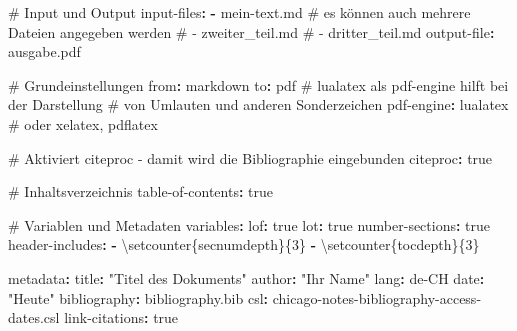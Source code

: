\documentclass[
  nswissgerman,
  a4paper,
  DIV=11,
  numbers=noendperiod,
  ngerman]{scrreprt}
\newenvironment{Shaded}{\begin{snugshade}}{\end{snugshade}}
\newcommand{\AttributeTok}[1]{\textcolor[rgb]{0.40,0.45,0.13}{#1}}
\newcommand{\CharTok}[1]{\textcolor[rgb]{0.13,0.47,0.30}{#1}}
\newcommand{\CommentTok}[1]{\textcolor[rgb]{0.37,0.37,0.37}{#1}}
\newcommand{\FunctionTok}[1]{\textcolor[rgb]{0.28,0.35,0.67}{#1}}
\newcommand{\KeywordTok}[1]{\textcolor[rgb]{0.00,0.23,0.31}{\textbf{#1}}}
\newcommand{\StringTok}[1]{\textcolor[rgb]{0.13,0.47,0.30}{#1}}
\begin{document}
\begin{Shaded}
\begin{Highlighting}[numbers=left,,]
\CommentTok{\# Input und Output}
\FunctionTok{input{-}files}\KeywordTok{:}
\AttributeTok{  }\KeywordTok{{-}}\AttributeTok{ mein{-}text.md}\CommentTok{  \# es können auch mehrere Dateien angegeben werden}
\CommentTok{  \# {-} zweiter\_teil.md}
\CommentTok{  \# {-} dritter\_teil.md}
\FunctionTok{output{-}file}\KeywordTok{:}\AttributeTok{ ausgabe.pdf}

\CommentTok{\# Grundeinstellungen}
\FunctionTok{from}\KeywordTok{:}\AttributeTok{ markdown}
\FunctionTok{to}\KeywordTok{:}\AttributeTok{ pdf}
\CommentTok{\# lualatex als pdf{-}engine hilft bei der Darstellung}
\CommentTok{\# von Umlauten und anderen Sonderzeichen}
\FunctionTok{pdf{-}engine}\KeywordTok{:}\AttributeTok{ lualatex}\CommentTok{ \# oder xelatex, pdflatex}

\CommentTok{\# Aktiviert citeproc {-} damit wird die Bibliographie eingebunden}
\FunctionTok{citeproc}\KeywordTok{:}\AttributeTok{ }\CharTok{true}

\CommentTok{\# Inhaltsverzeichnis}
\FunctionTok{table{-}of{-}contents}\KeywordTok{:}\AttributeTok{ }\CharTok{true}

\CommentTok{\# Variablen und Metadaten}
\FunctionTok{variables}\KeywordTok{:}
\AttributeTok{  }\FunctionTok{lof}\KeywordTok{:}\AttributeTok{ }\CharTok{true}
\AttributeTok{  }\FunctionTok{lot}\KeywordTok{:}\AttributeTok{ }\CharTok{true}
\AttributeTok{  }\FunctionTok{number{-}sections}\KeywordTok{:}\AttributeTok{ }\CharTok{true}
\AttributeTok{  }\FunctionTok{header{-}includes}\KeywordTok{:}
\AttributeTok{    }\KeywordTok{{-}}\AttributeTok{ \textbackslash{}setcounter\{secnumdepth\}\{3\}}
\AttributeTok{    }\KeywordTok{{-}}\AttributeTok{ \textbackslash{}setcounter\{tocdepth\}\{3\}}

\FunctionTok{metadata}\KeywordTok{:}
\AttributeTok{  }\FunctionTok{title}\KeywordTok{:}\AttributeTok{ }\StringTok{"Titel des Dokuments"}
\AttributeTok{  }\FunctionTok{author}\KeywordTok{:}\AttributeTok{ }\StringTok{"Ihr Name"}
\AttributeTok{  }\FunctionTok{lang}\KeywordTok{:}\AttributeTok{ de{-}CH}
\AttributeTok{  }\FunctionTok{date}\KeywordTok{:}\AttributeTok{ }\StringTok{"Heute"}
\AttributeTok{  }\FunctionTok{bibliography}\KeywordTok{:}\AttributeTok{ bibliography.bib}
\AttributeTok{  }\FunctionTok{csl}\KeywordTok{:}\AttributeTok{ chicago{-}notes{-}bibliography{-}access{-}dates.csl}
\AttributeTok{  }\FunctionTok{link{-}citations}\KeywordTok{:}\AttributeTok{ }\CharTok{true}
\end{Highlighting}
\end{Shaded}
\end{document}
